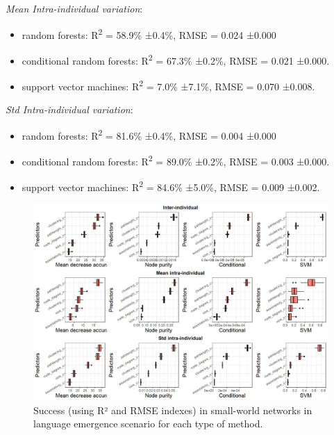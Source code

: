 \documentclass[
]{article}
\providecommand{\tightlist}{%
  \setlength{\itemsep}{0pt}\setlength{\parskip}{0pt}}
\begin{document}
\emph{Mean Intra-individual variation}:

\begin{itemize}
\tightlist
\item
  random forests: R\textsuperscript{2} = 58.9\% ±0.4\%, RMSE = 0.024
  ±0.000
\item
  conditional random forests: R\textsuperscript{2} = 67.3\% ±0.2\%, RMSE
  = 0.021 ±0.000.
\item
  support vector machines: R\textsuperscript{2} = 7.0\% ±7.1\%, RMSE =
  0.070 ±0.008.
\end{itemize}

\emph{Std Intra-individual variation}:

\begin{itemize}
\tightlist
\item
  random forests: R\textsuperscript{2} = 81.6\% ±0.4\%, RMSE = 0.004
  ±0.000
\item
  conditional random forests: R\textsuperscript{2} = 89.0\% ±0.2\%, RMSE
  = 0.003 ±0.000.
\item
  support vector machines: R\textsuperscript{2} = 84.6\% ±5.0\%, RMSE =
  0.009 ±0.002.
\end{itemize}

\begin{figure}[!H]

{\centering \includegraphics{./Figures/unnamed-chunk-100-1} 

}

\caption{Success (using R² and RMSE indexes) in small-world networks in language emergence scenario for each type of method.}\label{fig:unnamed-chunk-100}
\end{figure}
\end{document}
